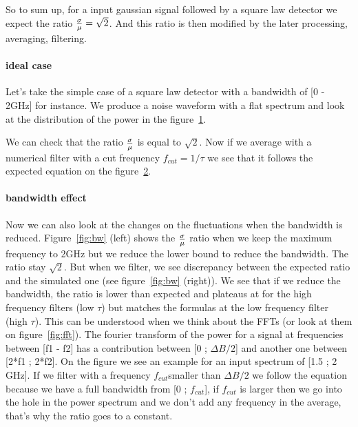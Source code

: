 So to  sum up, for  a input gaussian  signal followed by a  square law
detector we expect the  ratio $\rm \frac{\sigma}{\mu} = \sqrt{2}$. And
this  ratio  is then  modified  by  the  later processing,  averaging,
filtering.

\paragraph{ideal case}
Let's take the simple  case of a square law detector with
a bandwidth of  [0 - 2GHz] for instance.  We  produce a noise waveform
with a flat spectrum and look  at the distribution of the power in the
figure~\ref{fig:noise}.
\begin{figure}[!ht]
  \centering
  \hspace*{-3ex}
  \caption{}
  \label{fig:noise}
\end{figure}
We  can check that  the ratio  $\rm \frac{\sigma}{\mu}  $ is  equal to
$\sqrt{2}$.   Now if we  average with  a numerical  filter with  a cut
frequency  $f_{cut} =  1/\tau$ we  see  that it  follows the  expected
equation on the figure~\ref{fig:ratiofilter}. 
\begin{figure}[!ht]
  \centering
  \hspace*{-3ex}
  \caption{}
  \label{fig:ratiofilter}
\end{figure}

\paragraph{bandwidth effect}
Now  we can  also look  at the  changes on  the fluctuations  when the
bandwidth  is  reduced.   Figure~\ref{fig:bw}  (left) shows  the  $\rm
\frac{\sigma}{\mu} $ ratio when we  keep the maximum frequency to 2GHz
but we reduce the lower bound  to reduce the bandwidth. The ratio stay
$\sqrt{2}$.   But  when we  filter,  we  see  discrepancy between  the
expected  ratio   and  the  simulated   one  (see  figure~\ref{fig:bw}
(right)). We see  that if we reduce the bandwidth,  the ratio is lower
than  expected and  plateaus at  for the  high frequency  filters (low
$\tau$) but  matches the  formulas at the  low frequency  filter (high
$\tau$).  This can be understood when we think about the FFTs (or look
at them  on figure~\ref{fig:fft}). The fourier transform  of the power
for  a signal  at frequencies  between [f1  - f2]  has  a contribution
between [0 ;  $\Delta B/2$] and another one between  [2*f1 ; 2*f2]. On
the  figure we  see  an example  for an  input  spectrum of  [1.5 ;  2
  GHz]. If we  filter with a frequency $f_{cut}  $smaller than $\Delta
B/2$ we follow the equation because we have a full bandwidth from [0 ;
  $f_{cut}$], if $f_{cut}$  is larger then we go into  the hole in the
power spectrum and  we don't add any frequency  in the average, that's
why the ratio goes to a constant.

